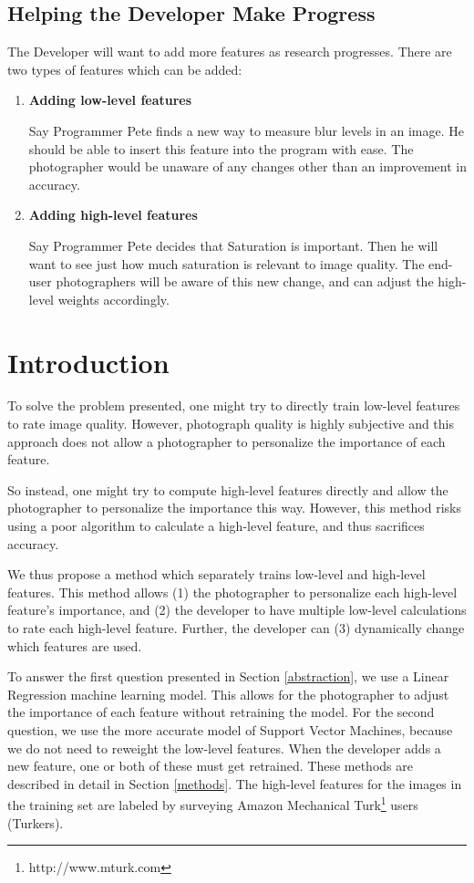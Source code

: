 \documentclass[11pt,letter]{article}
\begin{document}
\subsection{Helping the Developer Make Progress}
\label{easeofprogramming}
The Developer will want to add more features as research progresses. There are two types of features which can be added:
\begin{enumerate}
\item \textbf{Adding low-level features}

Say Programmer Pete finds a new way to measure blur levels in an image. He should be able to insert this feature into the program with ease. The photographer would be unaware of any changes other than an improvement in accuracy.

\item \textbf{Adding high-level features}

Say Programmer Pete decides that Saturation is important. Then he will want to see just how much saturation is relevant to image quality. The end-user photographers will be aware of this new change, and can adjust the high-level weights accordingly.
\end{enumerate}

\section{Introduction}
To solve the problem presented, one might try to directly train low-level features to rate image quality. However, photograph quality is highly subjective and this approach does not allow a photographer to personalize the importance of each feature.

So instead, one might try to compute high-level features directly and allow the photographer to personalize the importance this way. However, this method risks using a poor algorithm to calculate a high-level feature, and thus sacrifices accuracy.

We thus propose a method which separately trains low-level and high-level features. This method allows (1) the photographer to personalize each high-level feature's importance, and (2) the developer to have multiple low-level calculations to rate each high-level feature. Further, the developer can (3) dynamically change which features are used.

To answer the first question presented in Section \ref{abstraction}, we use a Linear Regression machine learning model. This allows for the photographer to adjust the importance of each feature without retraining the model. For the second question, we use the more accurate model of Support Vector Machines, because we do not need to reweight the low-level features. When the developer adds a new feature, one or both of these must get retrained. These methods are described in detail in Section \ref{methods}. The high-level features for the images in the training set are labeled by surveying Amazon Mechanical Turk\footnote{http://www.mturk.com} users (Turkers).
\end{document}
